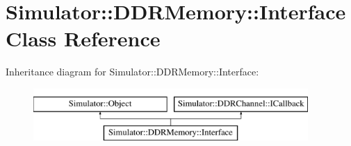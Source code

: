 \hypertarget{class_simulator_1_1_d_d_r_memory_1_1_interface}{\section{Simulator\+:\+:D\+D\+R\+Memory\+:\+:Interface Class Reference}
\label{class_simulator_1_1_d_d_r_memory_1_1_interface}
}
Inheritance diagram for Simulator\+:\+:D\+D\+R\+Memory\+:\+:Interface\+:\begin{figure}[H]
\begin{center}
\leavevmode
\includegraphics[height=2.000000cm]{class_simulator_1_1_d_d_r_memory_1_1_interface}
\end{center}
\end{figure}
